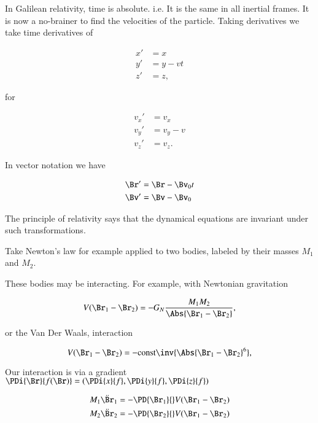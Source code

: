 In Galilean relativity, time is absolute.  i.e. It is the same in all inertial frames.  It is now a no-brainer to find the velocities of the particle.  Taking derivatives we take time derivatives of

\begin{align}\label{eqn:relativisticElectrodynamicsL1:40}
x' &= x \\
y' &= y - v t \\
z' &= z,
\end{align}

for

\begin{align}\label{eqn:relativisticElectrodynamicsL1:50}
v_x' &= v_x \\
v_y' &= v_y - v \\
v_z' &= v_z.
\end{align}

In vector notation we have 

\begin{align}\label{eqn:relativisticElectrodynamicsL1:60}
\Br' &= \Br - \Bv_0 t \\
\Bv' &= \Bv - \Bv_0 
\end{align}

The principle of relativity says that the dynamical equations are invariant under such transformations.

Take Newton's law for example applied to two bodies, labeled by their masses $M_1$ and $M_2$.

These bodies may be interacting.  For example, with Newtonian gravitation

\begin{equation}\label{eqn:relativisticElectrodynamicsL1:70}
V(\Br_1 - \Br_2) = -G_N \frac{M_1 M_2}{\Abs{\Br_1 - \Br_2}},
\end{equation}

or the Van Der Waals, interaction

\begin{equation}\label{eqn:relativisticElectrodynamicsL1:80}
V(\Br_1 - \Br_2) = - \text{const} \inv{\Abs{\Br_1 - \Br_2}^6},
\end{equation}

Our interaction is via a gradient $\PDi{\Br}{f(\Br)} = ( \PDi{x}{f}, \PDi{y}{f}, \PDi{z}{f} )$

\begin{align}\label{eqn:relativisticElectrodynamicsL1:90}
M_1 \ddot{\Br}_1 &= -\PD{\Br_1}{} V(\Br_1 - \Br_2) \\
M_2 \ddot{\Br}_2 &= -\PD{\Br_2}{} V(\Br_1 - \Br_2)
\end{align}

